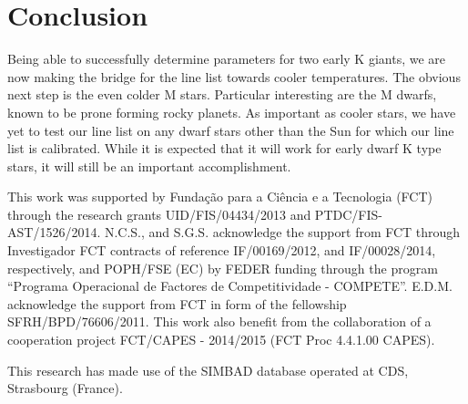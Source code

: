 \documentclass{aa}
\begin{document}
\section{Conclusion}
\label{sec:conclusion}

Being able to successfully determine parameters for two early K giants, we are
now making the bridge for the line list towards cooler temperatures. The obvious
next step is the even colder M stars. Particular interesting are the M dwarfs,
known to be prone forming rocky planets. As important as cooler stars, we have
yet to test our line list on any dwarf stars other than the Sun for which our
line list is calibrated. While it is expected that it will work for early dwarf
K type stars, it will still be an important accomplishment.





\begin{acknowledgements}

This work was supported by Funda\c{c}\~ao para a Ci\^encia e a Tecnologia (FCT)
through the research grants UID/FIS/04434/2013 and PTDC/FIS-AST/1526/2014.
N.C.S., and S.G.S. acknowledge the support from FCT through Investigador FCT
contracts of reference IF/00169/2012, and IF/00028/2014, respectively, and
POPH/FSE (EC) by FEDER funding through the program “Programa Operacional de
Factores de Competitividade - COMPETE”. E.D.M. acknowledge the support from FCT
in form of the fellowship SFRH/BPD/76606/2011. This work also benefit from the
collaboration of a cooperation project FCT/CAPES - 2014/2015 (FCT Proc 4.4.1.00
CAPES).

This research has made use of the SIMBAD database operated at CDS, Strasbourg
(France).

\end{acknowledgements}




\end{document}
